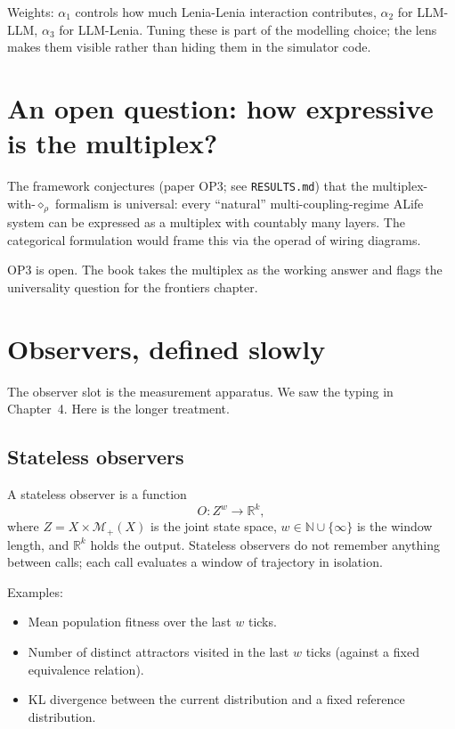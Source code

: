 Weights: $\alpha_1$ controls how much Lenia-Lenia interaction
contributes, $\alpha_2$ for LLM-LLM, $\alpha_3$ for LLM-Lenia. Tuning
these is part of the modelling choice; the lens makes them visible
rather than hiding them in the simulator code.

\section{An open question: how expressive is the multiplex?}

The framework conjectures (paper OP3; see \texttt{RESULTS.md}) that
the multiplex-with-$\diamond_\rho$ formalism is universal: every
``natural'' multi-coupling-regime ALife system can be expressed as a
multiplex with countably many layers. The categorical formulation
would frame this via the operad of wiring diagrams.

OP3 is open. The book takes the multiplex as the working answer and
flags the universality question for the frontiers chapter.

\section{Observers, defined slowly}

The observer slot is the measurement apparatus. We saw the typing in
Chapter~4. Here is the longer treatment.

\subsection*{Stateless observers}

A stateless observer is a function
\[
  O : Z^w \to \mathbb{R}^k,
\]
where $Z = X \times \mathcal{M}_+(X)$ is the joint state space, $w \in
\mathbb{N} \cup \{\infty\}$ is the window length, and $\mathbb{R}^k$
holds the output. Stateless observers do not remember anything between
calls; each call evaluates a window of trajectory in isolation.

Examples:

\begin{itemize}[leftmargin=1.5em,itemsep=2pt]
  \item Mean population fitness over the last $w$ ticks.
  \item Number of distinct attractors visited in the last $w$ ticks
    (against a fixed equivalence relation).
  \item KL divergence between the current distribution and a fixed
    reference distribution.
\end{itemize}

